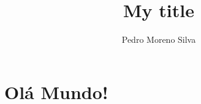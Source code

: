 \documentclass{article}
\title{My title}
\author{Pedro Moreno Silva}
\begin{document}
  \maketitle

  \section{Olá Mundo!}
\end{document}
